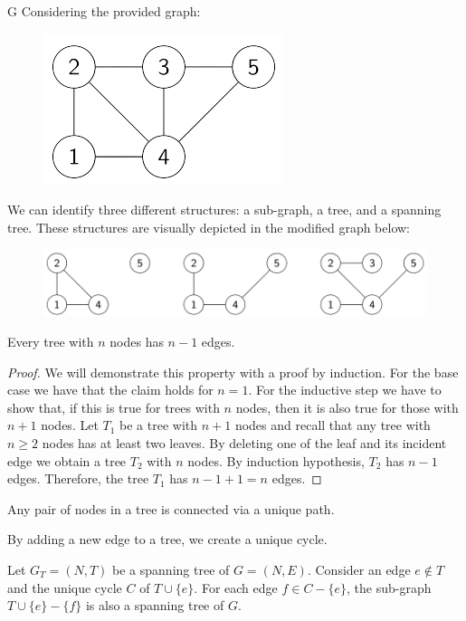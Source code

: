 \begin{example}G
    Considering the provided graph:
    \begin{figure}[H]
        \centering
        \includegraphics[width=0.3\linewidth]{images/sgraph.png}
    \end{figure}
    We can identify three different structures: a sub-graph, a tree, and a spanning tree. 
    These structures are visually depicted in the modified graph below:
    \begin{figure}[H]
        \centering
        \includegraphics[width=0.8\linewidth]{images/sgraphmod.png}
    \end{figure}
\end{example}
\begin{property}
    Every tree with $n$ nodes has $n-1$ edges. 
\end{property}
\begin{proof}
    We will demonstrate this property with a proof by induction. 
    For the base case we have that the claim holds for $n=1$. 
    For the inductive step we have to show that, if this is true for trees with $n$ nodes, then it is also true for those with $n+1$ nodes. 
    Let $T_1$ be a tree with $n+1$ nodes and recall that any tree with $n \geq 2$ nodes has at least two leaves. 
    By deleting one of the leaf and its incident edge we obtain a tree $T_2$ with $n$ nodes. 
    By induction hypothesis, $T_2$ has $n-1$ edges. 
    Therefore, the tree $T_1$ has $n-1+1=n$ edges. 
\end{proof}
\begin{property}
    Any pair of nodes in a tree is connected via a unique path. 
\end{property}
\begin{property}
    By adding a new edge to a tree, we create a unique cycle. 
\end{property}
\begin{property}
    Let $G_T=(N,T)$ be a spanning tree of $G=(N,E)$. 
    Consider an edge $e \notin T$ and the unique cycle $C$ of $T \cup \{e\}$. 
    For each edge $f \in C-\{e\}$, the sub-graph $T\cup \{e\}-\{f\}$ is also a spanning tree of $G$. 
\end{property}